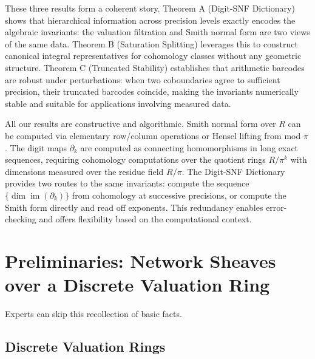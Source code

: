 \documentclass[11pt]{amsart}
\theoremstyle{plain}
\theoremstyle{definition}
\newcommand{\Ring}{R}                          %
\newcommand{\unif}{\pi}                        %
\newcommand{\Digit}[1]{\partial_{#1}}%
\DeclareMathOperator{\im}{im}                         %
\begin{document}
These three results form a coherent story. Theorem A (Digit-SNF Dictionary) shows that hierarchical information across precision levels exactly encodes the algebraic invariants: the valuation filtration and Smith normal form are two views of the same data. Theorem B (Saturation Splitting) leverages this to construct canonical integral representatives for cohomology classes without any geometric structure. Theorem C (Truncated Stability) establishes that arithmetic barcodes are robust under perturbations: when two coboundaries agree to sufficient precision, their truncated barcodes coincide, making the invariants numerically stable and suitable for applications involving measured data.

All our results are constructive and algorithmic. Smith normal form over $\Ring$ can be computed via elementary row/column operations or Hensel lifting from mod $\unif$ \cite{Kannan1979}. The digit maps $\Digit{k}$ are computed as connecting homomorphisms in long exact sequences, requiring cohomology computations over the quotient rings $\Ring/\unif^k$ with dimensions measured over the residue field $\Ring/\unif$. The Digit-SNF Dictionary provides two routes to the same invariants: compute the sequence $\{\dim \im(\Digit{k})\}$ from cohomology at successive precisions, or compute the Smith form directly and read off exponents. This redundancy enables error-checking and offers flexibility based on the computational context.

\section{Preliminaries: Network Sheaves over a Discrete Valuation Ring}
\label{sec:prelims}

Experts can skip this recollection of basic facts. 

\subsection{Discrete Valuation Rings}
\label{ssec:dvr}
\end{document}
